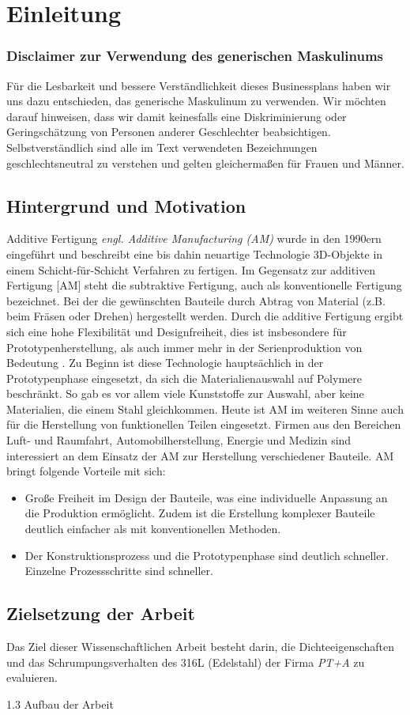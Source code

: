 \chapter{Einleitung}
\label{einleitung}

\subsection*{Disclaimer zur Verwendung des generischen Maskulinums}
Für die Lesbarkeit und bessere Verständlichkeit dieses Businessplans haben wir uns dazu entschieden, das generische Maskulinum zu verwenden. Wir möchten darauf hinweisen, dass wir damit keinesfalls eine Diskriminierung oder Geringschätzung von Personen anderer Geschlechter beabsichtigen. Selbstverständlich sind alle im Text verwendeten Bezeichnungen geschlechtsneutral zu verstehen und gelten gleichermaßen für Frauen und Männer.

\pagebreak

\section{Hintergrund und Motivation}
Additive Fertigung \textit{engl. Additive Manufacturing (AM)} wurde in den 1990ern eingeführt und beschreibt eine bis dahin neuartige Technologie 3D-Objekte in einem Schicht-für-Schicht Verfahren zu fertigen. Im Gegensatz zur additiven Fertigung [AM] steht die subtraktive Fertigung, auch als konventionelle Fertigung bezeichnet. Bei der die gewünschten Bauteile durch Abtrag von Material (z.B. beim Fräsen oder Drehen) hergestellt werden. Durch die additive Fertigung ergibt sich eine hohe Flexibilität und Designfreiheit, dies ist insbesondere für Prototypenherstellung, als auch immer mehr in der Serienproduktion von Bedeutung \autocite{Prof.Dr.Ing.ChristianSeidel.2023}.
Zu Beginn ist diese Technologie hauptsächlich in der Prototypenphase eingesetzt, da sich die Materialienauswahl auf Polymere beschränkt. So gab es vor allem viele Kunststoffe zur Auswahl, aber keine Materialien, die einem Stahl gleichkommen.
Heute ist AM im weiteren Sinne auch für die Herstellung von funktionellen Teilen eingesetzt.  Firmen aus den Bereichen Luft- und Raumfahrt, Automobilherstellung, Energie und Medizin sind interessiert an dem Einsatz der AM zur Herstellung verschiedener Bauteile.
AM bringt folgende Vorteile mit sich:
\begin{itemize}
    \item Große Freiheit im Design der Bauteile, was eine individuelle Anpassung an die Produktion ermöglicht. Zudem ist die Erstellung komplexer Bauteile deutlich einfacher als mit konventionellen Methoden.
    \item Der Konstruktionsprozess und die Prototypenphase sind deutlich schneller. Einzelne Prozessschritte sind schneller.
\end{itemize}

\section{Zielsetzung der Arbeit}

Das Ziel dieser Wissenschaftlichen Arbeit besteht darin, die Dichteeigenschaften und das Schrumpungsverhalten des 316L (Edelstahl) der Firma \textit{PT+A} zu evaluieren. 


    
1.3 Aufbau der Arbeit
